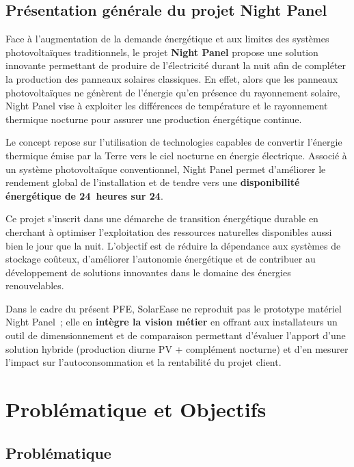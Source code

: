 \subsection{Présentation générale du projet Night Panel}

Face à l'augmentation de la demande énergétique et aux limites des systèmes
photovoltaïques traditionnels, le projet \textbf{Night Panel} propose une
solution innovante permettant de produire de l'électricité durant la nuit afin
de compléter la production des panneaux solaires classiques. En effet, alors
que les panneaux photovoltaïques ne génèrent de l'énergie qu'en présence du
rayonnement solaire, Night Panel vise à exploiter les différences de température
et le rayonnement thermique nocturne pour assurer une production énergétique
continue.

Le concept repose sur l'utilisation de technologies capables de convertir
l'énergie thermique émise par la Terre vers le ciel nocturne en énergie
électrique. Associé à un système photovoltaïque conventionnel, Night Panel
permet d'améliorer le rendement global de l'installation et de tendre vers
une \textbf{disponibilité énergétique de 24~heures sur 24}.

Ce projet s'inscrit dans une démarche de transition énergétique durable en
cherchant à optimiser l'exploitation des ressources naturelles disponibles
aussi bien le jour que la nuit. L'objectif est de réduire la dépendance aux
systèmes de stockage coûteux, d'améliorer l'autonomie énergétique et de
contribuer au développement de solutions innovantes dans le domaine des
énergies renouvelables.

Dans le cadre du présent PFE, SolarEase ne reproduit pas le prototype matériel
Night Panel~; elle en \textbf{intègre la vision métier} en offrant aux
installateurs un outil de dimensionnement et de comparaison permettant
d'évaluer l'apport d'une solution hybride (production diurne PV + complément
nocturne) et d'en mesurer l'impact sur l'autoconsommation et la rentabilité
du projet client.

\section{Problématique et Objectifs}

\subsection{Problématique}

